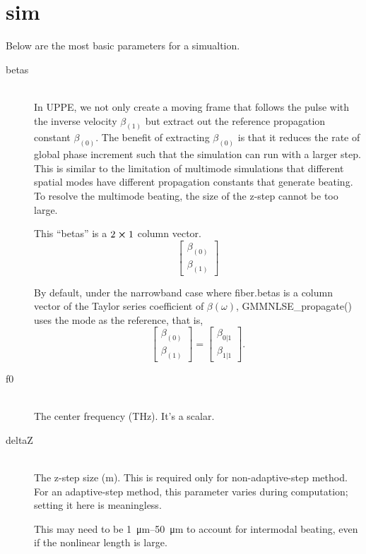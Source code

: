 \documentclass[12pt,hidelinks]{book}
\begin{document}
\section{sim}
Below are the most basic parameters for a simualtion.
\begin{description}
\item[betas]\mbox{}\\
In UPPE, we not only create a moving frame that follows the pulse with the inverse velocity $\beta_{(1)}$ but extract out the reference propagation constant $\beta_{(0)}$. The benefit of extracting $\beta_{(0)}$ is that it reduces the rate of global phase increment such that the simulation can run with a larger step. This is similar to the limitation of multimode simulations that different spatial modes have different propagation constants that generate beating. To resolve the multimode beating, the size of the z-step cannot be too large.

This ``betas'' is a $2\cross1$ column vector.
\begin{equation}
\begin{bmatrix}
\beta_{(0)} \\ \beta_{(1)}
\end{bmatrix}
\end{equation}

By default, under the narrowband case where fiber.betas is a column vector of the Taylor series coefficient of $\beta(\omega)$, GMMNLSE\_propagate() uses the  mode as the reference, that is, 
\begin{equation}
\begin{bmatrix}
\beta_{(0)} \\ \beta_{(1)}
\end{bmatrix}=
\begin{bmatrix}
\beta_{0|1} \\ \beta_{1|1}
\end{bmatrix}.
\end{equation}

\item[\color{blue}f0]\mbox{}\\
The center frequency (\si{\THz}). It's a scalar.

\item[deltaZ]\mbox{}\\
The z-step size (\si{m}). This is required only for non-adaptive-step method. For an adaptive-step method, this parameter varies during computation; setting it here is meaningless.

This may need to be \SIrange[range-units=single,range-phrase = --]{1}{50}{\um} to account for intermodal beating, even if the nonlinear length is large.


\end{description}
\end{document}
